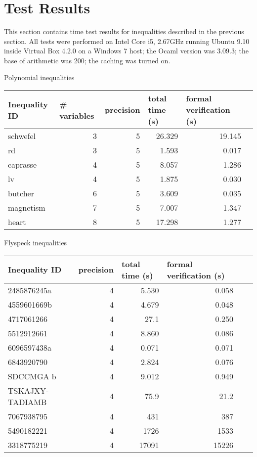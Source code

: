 \documentclass[a4paper]{article}
\begin{document}
\section{Test Results}
This section contains time test results for inequalities described in the previous section. All tests were performed on Intel Core i5, 2.67GHz running Ubuntu 9.10 inside Virtual Box 4.2.0 on a Windows 7 host; the Ocaml version was 3.09.3; the base of arithmetic was 200; the caching was turned on.

\begin{center}
Polynomial inequalities

\begin{tabular}{l@{\quad} r r r r r}
\hline
\multicolumn{1}{l}{\rule{0pt}{12pt}Inequality ID}&
\multicolumn{1}{l}{\phantom{x}\# variables}&
\multicolumn{1}{l}{\phantom{x}precision}&
\multicolumn{1}{l}{\phantom{x}total time (s)}&
\multicolumn{1}{l}{\phantom{x}formal verification (s)}\\
\hline\rule{0pt}{12pt}%
schwefel	& 3	& 5		& 26.329 &	19.145 \\
rd			& 3 & 5		& 1.593 &	0.017 \\
caprasse	& 4 & 5		& 8.057	&	1.286 \\
lv			& 4	& 5		& 1.875 &	0.030 \\
butcher		& 6 & 5		& 3.609 &	0.035 \\
magnetism	& 7 & 5		& 7.007 &	1.347 \\
heart		& 8 & 5		& 17.298 &	1.277 \\
\hline
\end{tabular}
\end{center}

\begin{center}
Flyspeck inequalities

\begin{tabular}{l@{\quad} r r r r r}
\hline
\multicolumn{1}{l}{\rule{0pt}{12pt}Inequality ID}&
\multicolumn{1}{l}{\phantom{x}precision}&
\multicolumn{1}{l}{\phantom{x}total time (s)}&
\multicolumn{1}{l}{\phantom{x}formal verification (s)}\\
\hline\rule{0pt}{12pt}%
2485876245a	& 4 & 5.530 & 0.058 \\
4559601669b & 4 & 4.679 & 0.048 \\
4717061266  & 4 & 27.1 & 0.250 \\
5512912661  & 4 & 8.860 & 0.086 \\
6096597438a & 4 & 0.071 & 0.071 \\
6843920790  & 4 & 2.824 & 0.076 \\
SDCCMGA b   & 4 & 9.012 & 0.949 \\
TSKAJXY-TADIAMB & 4 & 75.9 & 21.2 \\
7067938795  & 4 & 431   & 387 \\
5490182221  & 4 & 1726  & 1533 \\
3318775219  & 4 & 17091 & 15226 \\
\hline
\end{tabular}
\end{center}
\end{document}
